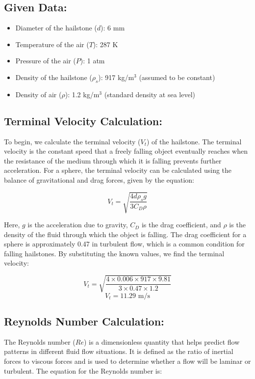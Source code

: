 \documentclass{article}
\numberwithin{equation}{section}
\begin{document}
\subsection*{Given Data:}
\begin{itemize}
    \item Diameter of the hailstone (\(d\)): 6 mm
    \item Temperature of the air (\(T\)): 287 K
    \item Pressure of the air (\(P\)): 1 atm
    \item Density of the hailstone (\(\rho_s\)): 917 kg/m\(^3\) (assumed to be constant)
    \item Density of air (\(\rho\)): 1.2 kg/m\(^3\) (standard density at sea level)
\end{itemize}

\subsection*{Terminal Velocity Calculation:}
To begin, we calculate the terminal velocity (\(V_t\)) of the hailstone. The terminal velocity is the constant speed that a freely falling object eventually reaches when the resistance of the medium through which it is falling prevents further acceleration. For a sphere, the terminal velocity can be calculated using the balance of gravitational and drag forces, given by the equation:

\begin{equation}
V_t = \sqrt{\frac{4 d \rho_s g}{3 C_D \rho}}
\end{equation}

Here, \(g\) is the acceleration due to gravity, \(C_D\) is the drag coefficient, and \(\rho\) is the density of the fluid through which the object is falling. The drag coefficient for a sphere is approximately 0.47 in turbulent flow, which is a common condition for falling hailstones. By substituting the known values, we find the terminal velocity:

\begin{equation}
V_t = \sqrt{\frac{4 \times 0.006 \times 917 \times 9.81}{3 \times 0.47 \times 1.2}}
\end{equation}
\begin{equation}
V_t = 11.29 \text{ m/s}
\end{equation}

\subsection*{Reynolds Number Calculation:}
The Reynolds number (\(Re\)) is a dimensionless quantity that helps predict flow patterns in different fluid flow situations. It is defined as the ratio of inertial forces to viscous forces and is used to determine whether a flow will be laminar or turbulent. The equation for the Reynolds number is:
\end{document}
